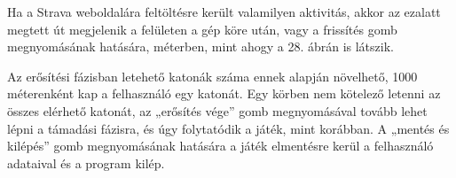  


Ha a Strava weboldalára feltöltésre került valamilyen aktivitás, akkor az ezalatt megtett út megjelenik a felületen a gép köre után, vagy a frissítés gomb megnyomásának hatására, méterben, mint ahogy a 28. ábrán is látszik. 

 


Az erősítési fázisban letehető katonák száma ennek alapján növelhető, 1000 méterenként kap a felhasználó egy katonát. Egy körben nem kötelező letenni az összes elérhető katonát, az „erősítés vége” gomb megnyomásával tovább lehet lépni a támadási fázisra, és úgy folytatódik a játék, mint korábban. A „mentés és kilépés” gomb megnyomásának hatására a játék elmentésre kerül a felhasználó adataival és a program kilép. 